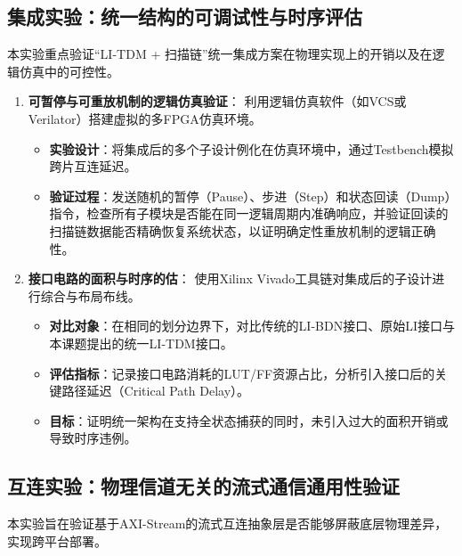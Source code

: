 \subsection{集成实验：统一结构的可调试性与时序评估}

本实验重点验证“LI-TDM + 扫描链”统一集成方案在物理实现上的开销以及在逻辑仿真中的可控性。

\begin{enumerate}
    \item \textbf{可暂停与可重放机制的逻辑仿真验证}：
          利用逻辑仿真软件（如VCS或Verilator）搭建虚拟的多FPGA仿真环境。
          \begin{itemize}
              \item \textbf{实验设计}：将集成后的多个子设计例化在仿真环境中，通过Testbench模拟跨片互连延迟。
              \item \textbf{验证过程}：发送随机的暂停（Pause）、步进（Step）和状态回读（Dump）指令，检查所有子模块是否能在同一逻辑周期内准确响应，并验证回读的扫描链数据能否精确恢复系统状态，以证明确定性重放机制的逻辑正确性。
          \end{itemize}
          
    \item \textbf{接口电路的面积与时序的估}：
          使用Xilinx Vivado工具链对集成后的子设计进行综合与布局布线。
          \begin{itemize}
              \item \textbf{对比对象}：在相同的划分边界下，对比传统的LI-BDN接口、原始LI接口与本课题提出的统一LI-TDM接口。
              \item \textbf{评估指标}：记录接口电路消耗的LUT/FF资源占比，分析引入接口后的关键路径延迟（Critical Path Delay）。
              \item \textbf{目标}：证明统一架构在支持全状态捕获的同时，未引入过大的面积开销或导致时序违例。
          \end{itemize}
\end{enumerate}

\subsection{互连实验：物理信道无关的流式通信通用性验证}

本实验旨在验证基于AXI-Stream的流式互连抽象层是否能够屏蔽底层物理差异，实现跨平台部署。

